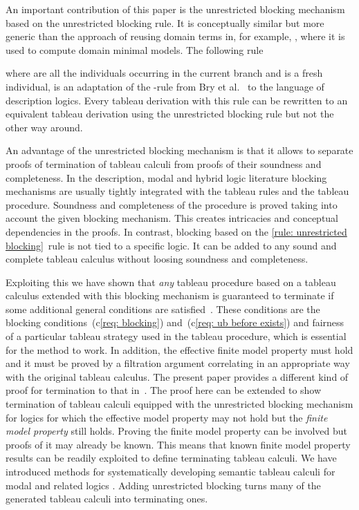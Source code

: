 \documentclass[leqno
,pdflatex
,prodmode
,acmtocl
]{acmsmall}
\begin{document}
An important contribution of this paper is the unrestricted blocking mechanism
based on the unrestricted blocking rule.
It is conceptually similar but more generic than the approach of
reusing domain terms in, for example, \cite{BryManthey87,BryTorge98}, where it is
used to compute domain minimal models.
The following rule

where  are all the individuals occurring in the current branch 
and  is a fresh individual,
is an adaptation of the -rule
from Bry et al.\ \citeyear{BryManthey87,BryTorge98} 
to the language of description logics.
Every tableau derivation
with this rule can be rewritten to an equivalent tableau derivation
using the unrestricted blocking rule
but not the other way around.

An advantage of the unrestricted blocking mechanism is that
it allows to separate proofs of termination of tableau calculi from
proofs of their soundness and completeness.
In the description, modal and hybrid logic literature blocking mechanisms are
usually tightly integrated with the tableau rules and the tableau procedure.
Soundness and completeness of the procedure is proved taking into
account the given blocking mechanism.
This creates intricacies and conceptual dependencies
in the proofs.
In contrast, blocking based on the \eqref{rule: unrestricted blocking}~rule is not tied to a specific logic.
It can be added to any sound and complete
tableau calculus without loosing soundness and completeness.

Exploiting this we have shown that
\emph{any} tableau procedure based on a tableau calculus extended
with this blocking mechanism is guaranteed to terminate if some
additional general conditions are satisfied~\cite{SchmidtTishkovsky-GTM+-2008}.
These conditions are the blocking conditions~(c\ref{req: blocking})
and~(c\ref{req: ub before exists}) and fairness of a particular tableau
strategy used in the tableau procedure, which is essential for
the method to work.
In addition, the effective finite model property must hold and it must
be proved by a filtration argument correlating in an appropriate
way with the original tableau calculus.
The present paper provides a different kind of proof for termination
to that in~\cite{SchmidtTishkovsky-GTM+-2008}.
The proof here can be extended to show
termination of tableau calculi equipped with the unrestricted blocking mechanism
for logics for which the effective model property may not hold but
the \emph{finite model property} still holds.
Proving the finite model property can be involved but 
proofs of it 
may already be known.
This means that known finite model
property results can be readily exploited to define terminating tableau
calculi.
We have introduced methods for systematically developing semantic tableau calculi for
modal and related logics \cite{Schmidt09d,SchmidtTishkovsky-ASTC-lmcs-2011}.
Adding unrestricted blocking turns many of the generated tableau
calculi into terminating
ones.
\end{document}
